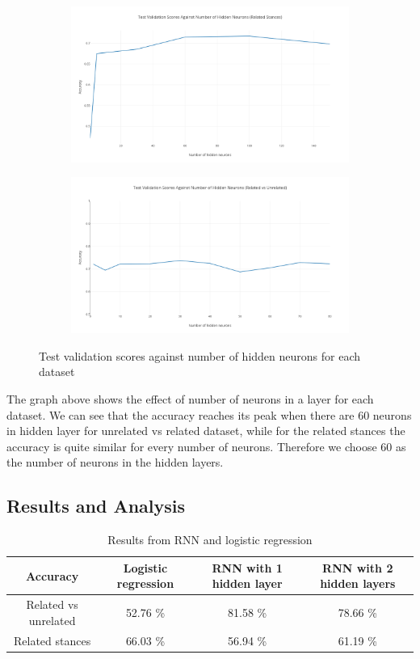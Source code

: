 \documentclass[11.5pt]{article}
\begin{document}
\begin{figure}[h!]
  \begin{subfigure}{.5\textwidth}
    \centering
    \includegraphics[width=.9\linewidth]{plot_9}
  \end{subfigure}
  \begin{subfigure}{.5\textwidth}
    \centering
    \includegraphics[width=.9\linewidth]{plot_11}
  \end{subfigure}
  \caption{Test validation scores against number of hidden neurons for each dataset}
  \label{fig:neurons}
\end{figure}

The graph above shows the effect of number of neurons in a layer for each dataset. We can see that the accuracy reaches its peak when there are 60 neurons in hidden layer for unrelated vs related dataset, while for the related stances
the accuracy is quite similar for every number of neurons. Therefore we choose 60 as the number of neurons in the hidden layers.

\subsection{Results and Analysis}

\begin{table}[h]
  \centering
  \begin{tabular} 
    {|c|c|c|c|}
    \hline
    Accuracy & Logistic regression & RNN with 1 hidden layer & RNN with 2 hidden layers \\
    \hline
    Related vs unrelated & 52.76 \% & 81.58 \% & 78.66 \% \\
    \hline
    Related stances & 66.03 \% & 56.94 \% & 61.19 \% \\
    \hline
  \end{tabular}
  \caption{Results from RNN and logistic regression}
\end{table}
\end{document}
